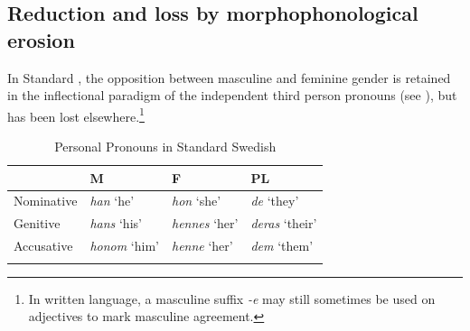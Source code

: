 \documentclass[output=collectionpaper]{langsci/langscibook}
\begin{document}
\newpage 
\subsection{Reduction and loss by morphophonological erosion}
\label{subsubsec:deflection}
 
In Standard , the opposition between masculine and feminine gender is retained in the inflectional paradigm of the independent third person pronouns (see ), but has been lost elsewhere.\footnote{In written language, a masculine suffix \textit{-e} may still sometimes be used on adjectives to mark masculine agreement.}

 \begin{table}[t]
\caption{Personal Pronouns in Standard Swedish}
\label{tab:3:Swedish}
 \begin{tabularx}{\textwidth}{XXXl} %
  \lsptoprule
&  M    & F & PL \\ %
  \midrule
Nominative & \textit{han} `he' & \textit{hon} `she' & \textit{de} `they'\\
Genitive & \textit{hans} `his' &  \textit{hennes} `her' & \textit{deras} `their'\\
Accusative &\textit{honom} `him'  & \textit{henne} `her' & \textit{dem} `them'\\
  \lspbottomrule
 \end{tabularx}
\end{table}
\end{document}
